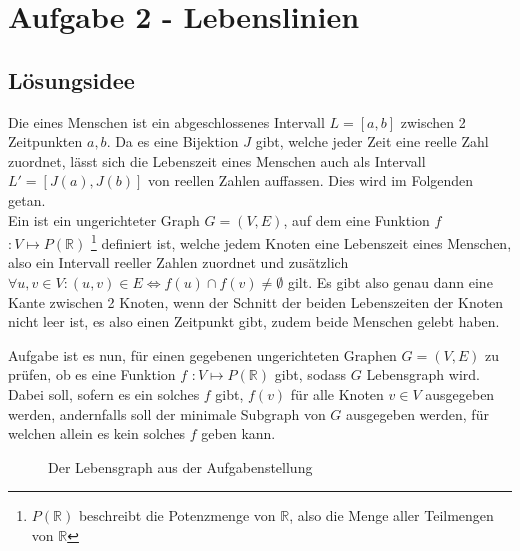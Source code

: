 \section{Aufgabe 2 - Lebenslinien}
\subsection{Lösungsidee}
Die  eines Menschen ist ein abgeschlossenes Intervall $L = [a,b]$ zwischen 2 Zeitpunkten $a, b$. Da es eine Bijektion $J$ gibt, welche jeder Zeit eine reelle Zahl zuordnet, lässt sich die Lebenszeit eines Menschen auch als Intervall $L' = [J(a),J(b)]$ von reellen Zahlen auffassen. Dies wird im Folgenden getan.\\
Ein  ist ein ungerichteter Graph $G = (V,E)$, auf dem eine Funktion $f$ \small{$ : V \mapsto P(\mathbb{R})$}
\footnote{$P(\mathbb{R})$ beschreibt die Potenzmenge von $\mathbb{R}$, also die Menge aller Teilmengen von $\mathbb{R}$} definiert ist, welche jedem Knoten eine Lebenszeit eines Menschen, also ein Intervall reeller Zahlen zuordnet und zusätzlich $\forall u,v \in V: (u,v) \in E \Leftrightarrow f(u) \cap f(v) \not= \emptyset $ gilt. Es gibt also genau dann eine Kante zwischen 2 Knoten, wenn der Schnitt der beiden Lebenszeiten der Knoten nicht leer ist, es also einen Zeitpunkt gibt, zudem beide Menschen gelebt haben.

Aufgabe ist es nun, für einen gegebenen ungerichteten Graphen $G = (V,E)$ zu prüfen, ob es eine Funktion $f$ \small{$ : V \mapsto P(\mathbb{R})$} gibt, sodass $G$ Lebensgraph wird.\\
Dabei soll, sofern es ein solches $f$ gibt, $f(v)$ für alle Knoten $v \in V$ ausgegeben werden, andernfalls soll der minimale Subgraph von $G$ ausgegeben werden, für welchen allein es kein solches $f$ geben kann.

\begin{center}
\begin{figure}[h]
\caption{Der Lebensgraph aus der Aufgabenstellung}
\end{figure}
\end{center}

